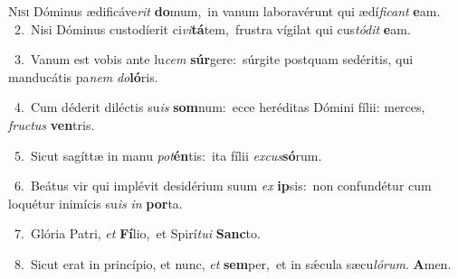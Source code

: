 \lettrine{\initial\textcolor{\initialcolor}{N}}{isi} Dóminus ædificáve\textit{rit} \textbf{do}\-mum,~\star in vanum laboravérunt qui ædí\-\textit{fi}\-\textit{cant} \textbf{e}\-am.\\
{\numbfont\textcolor{\numbcolor}{~2.}}~Nisi Dóminus custodíerit ci\-\textit{vi}\-\textbf{tá}tem,~\star frustra vígilat qui cus\-\textit{tó}\-\textit{dit} \textbf{e}\-am.\par
{\numbfont\textcolor{\numbcolor}{~3.}}~Vanum est vobis ante lu\textit{cem} \textbf{súr}\-gere:~\star súrgite postquam sedéritis, qui manducátis pa\textit{nem} \textit{do}\-\textbf{ló}ris.\par
{\numbfont\textcolor{\numbcolor}{~4.}}~Cum déderit diléctis su\textit{is} \textbf{som}\-num:~\star ecce heréditas Dómini fílii: merces, \textit{fruc}\-\textit{tus} \textbf{ven}\-tris.\par
{\numbfont\textcolor{\numbcolor}{~5.}}~Sicut sagíttæ in manu \textit{pot}\-\textbf{én}tis:~\star ita fílii \textit{ex}\-\textit{cus}\textbf{só}rum.\par
{\numbfont\textcolor{\numbcolor}{~6.}}~Beátus vir qui implévit desidérium suum \textit{ex} \textbf{ip}\-sis:~\star non confundétur cum loquétur inimícis su\textit{is} \textit{in} \textbf{por}\-ta.\par
{\numbfont\textcolor{\numbcolor}{~7.}}~Glória Patri, \textit{et} \textbf{Fí}\-lio,~\star et Spirí\-\textit{tu}\-\textit{i} \textbf{Sanc}\-to.\par
{\numbfont\textcolor{\numbcolor}{~8.}}~Sicut erat in princípio, et nunc, \textit{et} \textbf{sem}\-per,~\star et in sǽcula sæcu\-\textit{ló}\-\textit{rum}. \textbf{A}\-men.\par
